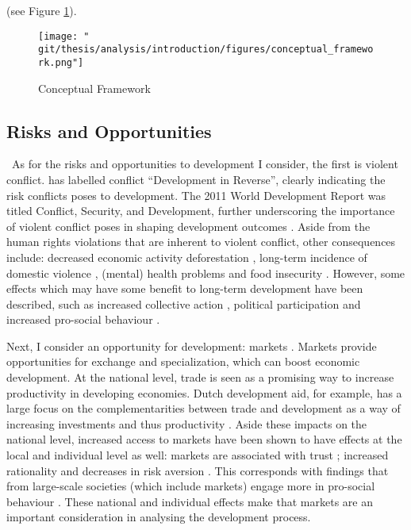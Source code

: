  (see Figure \ref{intro:fig:framework}).

\begin{figure}[htb]
  \centering
  \texttt{[image: "\\git/thesis/analysis/introduction/figures/conceptual\_framework.png"]}
  \caption{Conceptual Framework}
  \label{intro:fig:framework}
\end{figure}

\subsection{Risks and Opportunities}\
As for the risks and opportunities to development I consider, the first is violent conflict. \citet{Collier2003} has labelled conflict ``Development in Reverse'', clearly indicating the risk conflicts poses to development. The 2011 World Development Report was titled Conflict, Security, and Development, further underscoring the importance of violent conflict poses in shaping development outcomes \citep{WorldBank2011}. Aside from the human rights violations that are inherent to violent conflict, other consequences include: decreased economic activity \citep{Collier1999} deforestation \cite[e.g.][]{Connectiona}, long-term incidence of domestic violence \citep[e.g.][]{LaMattina2017, Muller2019}, (mental) health problems \cite[e.g.][]{Smith2002, Iqbal2006a,Akresh2011} and food insecurity \cite[e.g.][]{Lecoutere2005, Verwimp2012}. However, some effects which may have some benefit to long-term development have been described, such as increased collective action \citep{Bellows2009b}, political participation \citep{Blattman2009a} and increased pro-social behaviour \citep{Voors2012a}.

Next, I consider an opportunity for development: markets . Markets provide opportunities for exchange and specialization, which can boost economic development. At the national level, trade is seen as a promising way to increase productivity in developing economies. Dutch development aid, for example, has a large focus on the complementarities between trade and development as a way of increasing investments and thus productivity \citep[see e.g.][]{Zoomers2014}. Aside these impacts on the national level, increased access to markets have been shown to have effects at the local and individual level as well: markets are associated with trust \citep{Tu2010,Fischer2008}; increased rationality \citep{List2008,Cecchi2013,Braga2009} and decreases in risk aversion \citep{Melesse2015}. This corresponds with findings that from large-scale societies (which include markets) engage more in pro-social behaviour \cite{Henrich2005,Henrich2010}. These national and individual effects make that markets are an important consideration in analysing the development process.


